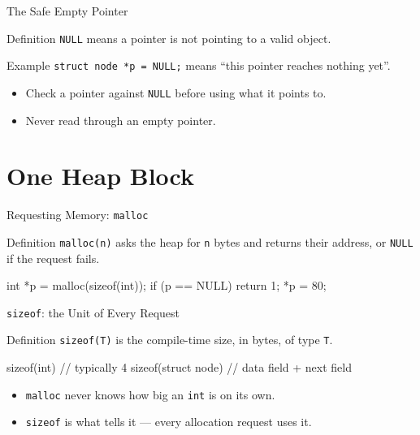 \documentclass[aspectratio=169]{beamer}
\begin{document}
\begin{frame}{The Safe Empty Pointer}
  \begin{block}{Definition}
    \texttt{NULL} means a pointer is not pointing to a valid object.
  \end{block}
  \begin{exampleblock}{Example}
    \texttt{struct node *p = NULL;} means ``this pointer reaches nothing yet''.
  \end{exampleblock}
  \begin{itemize}
    \item Check a pointer against \texttt{NULL} before using what it points to.
    \item Never read through an empty pointer.
  \end{itemize}
\end{frame}


\section{One Heap Block}


\begin{frame}[fragile]{Requesting Memory: \texttt{malloc}}
  \begin{block}{Definition}
    \texttt{malloc(n)} asks the heap for \texttt{n} bytes and returns their
    address, or \texttt{NULL} if the request fails.
  \end{block}
\begin{semiverbatim}
int *p = malloc(sizeof(int));
if (p == NULL) return 1;
*p = 80;
\end{semiverbatim}
\end{frame}

\begin{frame}[fragile]{\texttt{sizeof}: the Unit of Every Request}
  \begin{block}{Definition}
    \texttt{sizeof(T)} is the compile-time size, in bytes, of type \texttt{T}.
  \end{block}
\begin{semiverbatim}
sizeof(int)          \textcolor{neutral}{// typically 4}
sizeof(struct node)  \textcolor{neutral}{// data field + next field}
\end{semiverbatim}
  \begin{itemize}
    \item \texttt{malloc} never knows how big an \texttt{int} is on its own.
    \item \texttt{sizeof} is what tells it --- every allocation request uses it.
  \end{itemize}
\end{frame}
\end{document}
